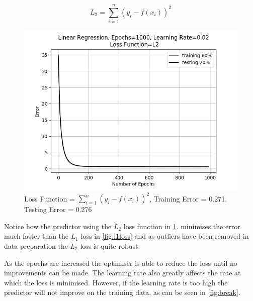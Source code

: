 \documentclass[10pt,twocolumn,letterpaper]{article}
\begin{document}
\begin{equation}
L_2 = \sum_{i = 1}^{n} (y_i - f(x_i))^2
\end{equation}

\begin{figure}[h]
	\begin{center}
		\includegraphics[width=0.9\linewidth]{img/l2loss.png}
	\end{center}
	\caption{Loss Function = $\sum_{i = 1}^{n} (y_i - f(x_i))^2$, Training Error = 0.271, Testing Error = 0.276}
	\label{fig:l2loss}
\end{figure}

Notice how the predictor using the $L_2$ loss function in \ref{fig:l2loss}. minimises the error much faster than the $L_1$ loss in \ref{fig:l1loss} and as outliers have been removed in data preparation the $L_2$ loss is quite robust.

As the epochs are increased the optimiser is able to reduce the loss until no improvements can be made. The learning rate also greatly affects the rate at which the loss is minimised. However, if the learning rate is too high the predictor will not improve on the training data, as can be seen in \ref{fig:break}.
\end{document}
